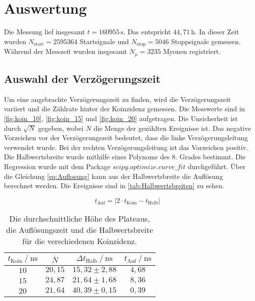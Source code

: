 \section{Auswertung}
\label{sec:auswertung}


Die Messung lief insgesamt $t = 160955 \, \unit{\second}$. Das entspricht $44,71 \, \unit{\hour}$. In dieser Zeit wurden $N_\text{start} = 2595364$ Startsignale und $N_\text{stop} = 5046$ Stoppsignale gemessen.
Während der Messzeit wurden insgesamt $N_{\mu} = 3235 $ Myonen registriert.

\subsection{Auswahl der Verzögerungszeit}
\label{sec:Verzögerungszeit}
Um eine angebrachte Verzögerungszeit zu finden, wird die Verzögerungszeit variiert und die Zählrate hinter der Koinzidenz gemessen.
Die Messwerte sind in \autoref{fig:koin_10}, \autoref{fig:koin_15} und \autoref{fig:koin_20} aufgetragen. Die Unsicherheit ist durch $ \sqrt{N}$ gegeben, wobei $N$ die Menge der gezählten Ereignisse ist.
Das negative Vorzeichen vor der Verzögerungszeit bedeutet, dass die linke Verzögerungsleitung verwendet wurde. Bei der rechten Verzögerungsleitung ist das Vorzeichen positiv.
Die Halbwertsbreite wurde mithilfe eines Polynoms des 8. Grades bestimmt. Die Regression wurde mit dem Package $scipy.optimize.curve\_ fit $  \cite{scipyop} durchgeführt. %
Über die Gleichung \eqref{eq:Auflosung} kann aus der Halbwertsbreite die Auflösung berechnet werden. Die Ereignisse sind in \autoref{tab:Halbwertsbreiten} zu sehen.

\begin{equation}
    t_\text{Auf} = \left|2 \cdot t_\text{Koin} - t_\text{Halb} \right|
    \label{eq:Auflosung}
\end{equation}

\begin{table}[H]
    \centering
    \caption{Die durchschnittliche Höhe des Plateaus, die Auflösungszeit und die Halbwertsbreite für die verschiedenen Koinzidenz.}
    \label{tab:Halbwertsbreiten}
    \begin{tabular}{c c c c}
    \toprule
     $t_\text{Koin} \mathbin{/} \unit{\nano\second} $ &$\bar{N}$ & $\Delta t_\text{Halb} \mathbin{/} \unit{\nano\second}$ & $t_\text{Auf} \mathbin{/} \unit{\nano\second}$ \\
    \midrule
        $10$&  $20,15$ &  $15,32 \pm 2,88$ & $4,68$\\ 
        $15$&  $24,87$ &  $21,64 \pm 1,68$ & $8,36$\\ 
        $20$&  $21,64$ &  $40,39 \pm 0,15$ & $0,39$\\ 
    \bottomrule
    \end{tabular}
    \end{table}

